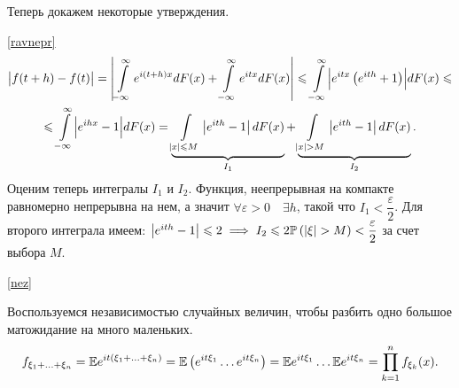\documentclass[../TV&MS.tex]{subfiles}
\begin{document}
Теперь докажем некоторые утверждения.

\begin{Proof} \eqref{ravnepr}
\begin{multline*}
    \bigl| f(t + h) - f(t) \bigr| = 
    \left| \int\limits_{-\infty}^{\infty} e^{i(t+h)x}dF(x) + 
    \int\limits_{-\infty}^{\infty} e^{itx}dF(x) \right| \leqslant
    \int\limits_{-\infty}^{\infty} \Bigl| e^{itx} \left( e^{ith} + 1 \right)  \Bigr| dF(x) \leqslant \\
    \leqslant \int\limits_{-\infty}^{\infty} \Bigl| e^{ihx} - 1 \Bigr| dF(x) =
    \underbrace{\int\limits_{|x| \leqslant M}^{} \left| e^{ith} - 1 \right| dF(x)}_{I_1} + 
    \underbrace{\int\limits_{|x| > M}^{} \left| e^{ith}-1 \right|dF(x)}_{I_2} 
.\end{multline*}
Оценим теперь интегралы $I_1$ и $I_2$.
Функция, неепрерывная на компакте равномерно непрерывна на нем, а значит
$\forall \varepsilon > 0 \quad \exists h$, такой что $I_1 < \dfrac{\varepsilon}{2}$.
Для второго интеграла имеем: $ \left| e^{ith} - 1 \right|\leqslant 2 \implies
I_2 \leqslant 2\mathbb{P} \left( \left| \xi \right| > M \right) < \dfrac{\varepsilon}{2}$ за счет выбора $M$.
\end{Proof} 

\begin{Proof} \eqref{nez}

Воспользуемся независимостью случайных величин, чтобы разбить одно большое матожидание на много маленьких.
    $$
        f_{\xi_1 +  \ldots + \xi_n} =
        \mathbb{E} e^{it(\xi_1 + \ldots + \xi_n)} = 
        \mathbb{E} \left( e^{it\xi_1} \ldots e^{it\xi_n} \right) =
        \mathbb{E} e^{it\xi_1}  \ldots \mathbb{E} e^{it\xi_n} =
        \prod\limits_{k=1}^{n} f_{\xi_k}(x)
    .$$ 
\end{Proof} 
\end{document}
